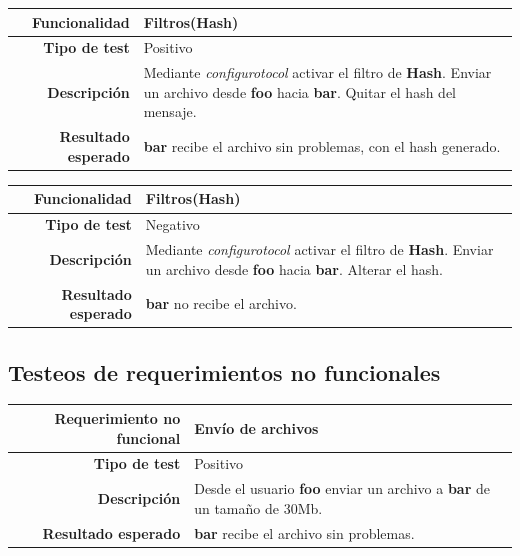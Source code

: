 \documentclass[a4paper,10pt]{article}
\begin{document}
\begin{center}
  \begin{tabular}{|r|p{12.5cm}|}
    \hline
    \textbf{Funcionalidad}	&	Filtros(Hash)\\
    \hline
    \textbf{Tipo de test}	&	Positivo\\
    \hline
    \textbf{Descripción}	&	Mediante \textit{configurotocol} activar el filtro de \textbf{Hash}. 
					Enviar un archivo desde \textbf{foo} hacia \textbf{bar}. Quitar el hash del mensaje.\\
    \hline
    \textbf{Resultado esperado}	&	\textbf{bar} recibe el archivo sin problemas, con el hash generado.\\
    \hline   
  \end{tabular}
\end{center}

\begin{center}
  \begin{tabular}{|r|p{12.5cm}|}
    \hline
    \textbf{Funcionalidad}	&	Filtros(Hash)\\
    \hline
    \textbf{Tipo de test}	&	Negativo\\
    \hline
    \textbf{Descripción}	&	Mediante \textit{configurotocol} activar el filtro de \textbf{Hash}. 
					Enviar un archivo desde \textbf{foo} hacia \textbf{bar}. Alterar el hash.\\
    \hline
    \textbf{Resultado esperado}	&	\textbf{bar} no recibe el archivo.\\
    \hline   
  \end{tabular}
\end{center}

\subsection{Testeos de requerimientos no funcionales}

\begin{center}
  \begin{tabular}{|r|p{12.5cm}|}
    \hline
    \textbf{Requerimiento no funcional}	& Envío de archivos\\
    \hline
    \textbf{Tipo de test}	&	Positivo\\
    \hline
    \textbf{Descripción}	&	Desde el usuario \textbf{foo} enviar un archivo a \textbf{bar} de un tamaño de 30Mb.\\
    \hline
    \textbf{Resultado esperado}	&	\textbf{bar} recibe el archivo sin problemas.\\
    \hline   
  \end{tabular}
\end{center}
\end{document}
